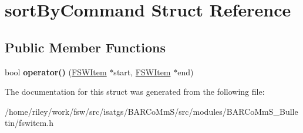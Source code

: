 \hypertarget{structsort_by_command}{}\section{sort\+By\+Command Struct Reference}
\label{structsort_by_command}
\subsection*{Public Member Functions}
\begin{DoxyCompactItemize}
\item 
bool {\bfseries operator()} (\hyperlink{class_f_s_w_item}{F\+S\+W\+Item} $\ast$start, \hyperlink{class_f_s_w_item}{F\+S\+W\+Item} $\ast$end)\hypertarget{structsort_by_command_a87753a83cf6532564f1f849e7da20edb}{}\label{structsort_by_command_a87753a83cf6532564f1f849e7da20edb}

\end{DoxyCompactItemize}


The documentation for this struct was generated from the following file\+:\begin{DoxyCompactItemize}
\item 
/home/riley/work/fsw/src/isatgs/\+B\+A\+R\+Co\+Mm\+S/src/modules/\+B\+A\+R\+Co\+Mm\+S\+\_\+\+Bulletin/fswitem.\+h\end{DoxyCompactItemize}
